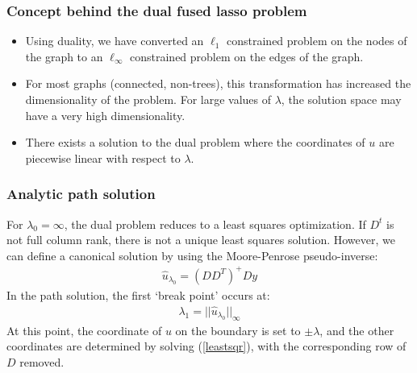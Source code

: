\begin{frame}
  \frametitle{Concept behind the dual fused lasso problem}
  \footnotesize

  \begin{itemize}
  \item Using duality, we have converted an $\ell_1$ constrained problem on the nodes of
  the graph to an $\ell_\infty$ constrained problem on the edges of the graph.
  \item For most graphs (connected, non-trees), this transformation has increased the
  dimensionality of the problem. For large values of $\lambda$, the solution space
  may have a very high dimensionality.
  \item {} There exists a solution to the dual
  problem where the coordinates of $u$ are piecewise linear with respect to $\lambda$.
  \end{itemize}

\end{frame}

\begin{frame}
  \frametitle{Analytic path solution}
  \footnotesize

  For $\lambda_0 = \infty$, the dual problem reduces to a least squares
  optimization. If $D^t$ is not full column rank, there is not a unique
  least squares solution. However, we can define a canonical solution by
  using the Moore-Penrose pseudo-inverse:
  \begin{align}
  \widehat{u}_{\lambda_0} = (DD^T)^{+} D y \label{leastsqr}
  \end{align}
  In the path solution, the first `break point' occurs at:
  \begin{align}
  \lambda_1 = || \widehat{u}_{\lambda_0} ||_\infty
  \end{align}
  At this point, the coordinate of $u$ on the boundary is set to $\pm \lambda$,
  and the other coordinates are determined by solving (\ref{leastsqr}), with
  the corresponding row of $D$ removed.

\end{frame}

